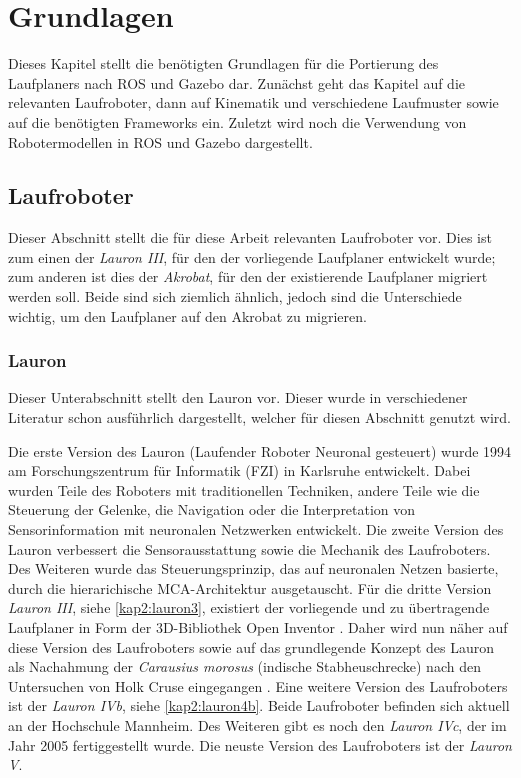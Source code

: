 \chapter{Grundlagen}
\label{kap2}

Dieses Kapitel stellt die benötigten Grundlagen für die Portierung des Laufplaners nach \ac{ROS} und Gazebo dar. Zunächst geht das Kapitel auf die relevanten Laufroboter, dann auf Kinematik und verschiedene Laufmuster sowie auf die benötigten Frameworks ein. Zuletzt wird noch die Verwendung von Robotermodellen in \ac{ROS} und Gazebo dargestellt.

\section{Laufroboter}

Dieser Abschnitt stellt die für diese Arbeit relevanten Laufroboter vor. Dies ist zum einen der \emph{Lauron III}, für den der vorliegende Laufplaner entwickelt wurde; zum anderen ist dies der \emph{Akrobat}, für den der existierende Laufplaner migriert werden soll. Beide sind sich ziemlich ähnlich, jedoch sind die Unterschiede wichtig, um den Laufplaner auf den Akrobat zu migrieren. 

\subsection{Lauron}

Dieser Unterabschnitt stellt den Lauron vor. Dieser wurde in verschiedener Literatur schon ausführlich dargestellt, welcher für diesen Abschnitt genutzt wird. \autocite{gassmann2000, troilo2007, berns1994adaptive, scholl2001modular, ziegenmeyer2009sechsbeinige}

Die erste Version des Lauron (Laufender Roboter Neuronal gesteuert) wurde 1994 am Forschungszentrum für Informatik (FZI) in Karlsruhe \autocite{fzi} entwickelt. Dabei wurden Teile des Roboters mit traditionellen Techniken, andere Teile wie die Steuerung der Gelenke, die Navigation oder die Interpretation von Sensorinformation mit neuronalen Netzwerken entwickelt. Die zweite Version des Lauron verbessert die Sensorausstattung sowie die Mechanik des Laufroboters. Des Weiteren wurde das Steuerungsprinzip, das auf neuronalen Netzen basierte, durch die hierarichische \ac{MCA}-Architektur ausgetauscht. Für die dritte Version \emph{Lauron III}, siehe \autoref{kap2:lauron3}, existiert der vorliegende und zu übertragende Laufplaner in Form der 3D-Bibliothek Open Inventor \autocite{inventor}. Daher wird nun näher auf diese Version des Laufroboters sowie auf das grundlegende Konzept des Lauron als Nachahmung der \emph{Carausius morosus} (indische Stabheuschrecke) nach den Untersuchen von Holk Cruse eingegangen \autocite{cruse1976function}. Eine weitere Version des Laufroboters ist der \emph{Lauron IVb}, siehe \autoref{kap2:lauron4b}. Beide Laufroboter befinden sich aktuell an der Hochschule Mannheim. Des Weiteren gibt es noch den \emph{Lauron IVc}, der im Jahr 2005 fertiggestellt wurde. Die neuste Version des Laufroboters ist der \emph{Lauron V}.

